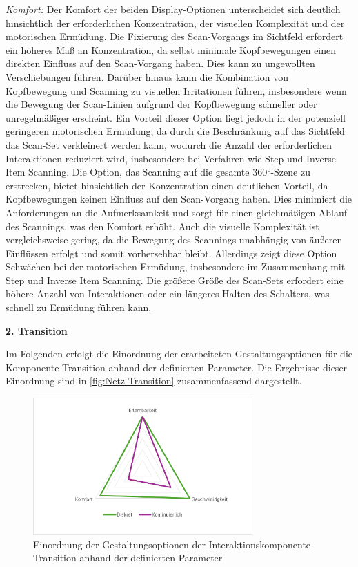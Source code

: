 \textit{Komfort:}
Der Komfort der beiden Display-Optionen unterscheidet sich deutlich hinsichtlich der erforderlichen Konzentration, der visuellen Komplexität und der motorischen Ermüdung.
Die Fixierung des Scan-Vorgangs im Sichtfeld erfordert ein höheres Maß an Konzentration, da selbst minimale Kopfbewegungen einen direkten Einfluss auf den Scan-Vorgang haben. Dies kann zu ungewollten Verschiebungen führen. Darüber hinaus kann die Kombination von Kopfbewegung und Scanning zu visuellen Irritationen führen, insbesondere wenn die Bewegung der Scan-Linien aufgrund der Kopfbewegung schneller oder unregelmäßiger erscheint. Ein Vorteil dieser Option liegt jedoch in der potenziell geringeren motorischen Ermüdung, da durch die Beschränkung auf das Sichtfeld das Scan-Set verkleinert werden kann, wodurch die Anzahl der erforderlichen Interaktionen reduziert wird, insbesondere bei Verfahren wie Step und Inverse Item Scanning. 
Die Option, das Scanning auf die gesamte 360°-Szene zu erstrecken, bietet hinsichtlich der Konzentration einen deutlichen Vorteil, da Kopfbewegungen keinen Einfluss auf den Scan-Vorgang haben. Dies minimiert die Anforderungen an die Aufmerksamkeit und sorgt für einen gleichmäßigen Ablauf des Scannings, was den Komfort erhöht. Auch die visuelle Komplexität ist vergleichsweise gering, da die Bewegung des Scannings unabhängig von äußeren Einflüssen erfolgt und somit vorhersehbar bleibt. Allerdings zeigt diese Option Schwächen bei der motorischen Ermüdung, insbesondere im Zusammenhang mit Step und Inverse Item Scanning. Die größere Größe des Scan-Sets erfordert eine höhere Anzahl von Interaktionen oder ein längeres Halten des Schalters, was schnell zu Ermüdung führen kann. 

\textbf{2. Transition} 

Im Folgenden erfolgt die Einordnung der erarbeiteten Gestaltungsoptionen für die Komponente Transition anhand der definierten Parameter. Die Ergebnisse dieser Einordnung sind in \autoref{fig:Netz-Transition} zusammenfassend dargestellt. 

\begin{figure}[tbh]
    \centering
    \includegraphics[width=0.75\textwidth]{images/Netzdiagramm-Transition.png}
    \caption{Einordnung der Gestaltungsoptionen der Interaktionskomponente Transition anhand der definierten Parameter}
    \label{fig:Netz-Transition}
\end{figure}

